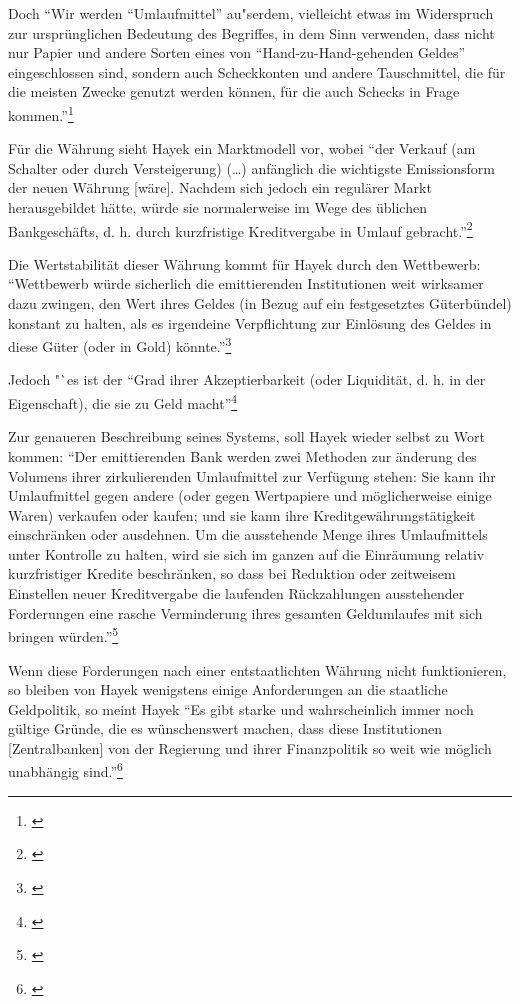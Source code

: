 \documentclass[
        onecolumn,
        a4paper,
        abstracton,
        parskip=half
        ,final
        ]{scrartcl}
\begin{document}
Doch
"`Wir werden "`Umlaufmittel"' au{"s}erdem, vielleicht etwas im Widerspruch zur urspr{\"u}nglichen Bedeutung des Begriffes, in dem Sinn verwenden, dass nicht nur Papier und andere Sorten eines von "`Hand-zu-Hand-gehenden Geldes"' eingeschlossen sind, sondern auch Scheckkonten und andere Tauschmittel, die f{\"u}r die meisten Zwecke genutzt werden k{\"o}nnen, f{\"u}r die auch Schecks in Frage kommen."'\footnote[417]{\citep*[S.43]{Hayek1977}}

F{\"u}r die W{\"a}hrung sieht Hayek ein Marktmodell vor, wobei "`der Verkauf (am Schalter oder durch Versteigerung) (\ldots) anf{\"a}nglich die wichtigste Emissionsform der neuen W{\"a}hrung [w{\"a}re]. Nachdem sich jedoch ein regul{\"a}rer Markt herausgebildet h{\"a}tte, w{\"u}rde sie normalerweise im Wege des {\"u}blichen Bankgesch{\"a}fts, d. h. durch kurzfristige Kreditvergabe in Umlauf gebracht."'\footnote[418]{\citep*[S.31]{Hayek1977}}

Die Wertstabilit{\"a}t dieser W{\"a}hrung kommt f{\"u}r Hayek durch den Wettbewerb: "`Wettbewerb w{\"u}rde sicherlich die emittierenden Institutionen weit wirksamer dazu zwingen, den Wert ihres Geldes (in Bezug auf ein festgesetztes G{\"u}terb{\"u}ndel) konstant zu halten, als es irgendeine Verpflichtung zur Einl{\"o}sung des Geldes in diese G{\"u}ter (oder in Gold) k{\"o}nnte."'\footnote[419]{\citep*[S.32]{Hayek1977}}

Jedoch "`es ist der "`Grad ihrer Akzeptierbarkeit (oder Liquidit{\"a}t, d. h. in der Eigenschaft), die sie zu Geld macht"'\footnote[420]{\citep*[S.40]{Hayek1977}}

Zur genaueren Beschreibung seines Systems, soll Hayek wieder selbst zu Wort kommen: "`Der emittierenden Bank werden zwei Methoden zur {\"a}nderung des Volumens ihrer zirkulierenden Umlaufmittel zur Verf{\"u}gung stehen: Sie kann ihr Umlaufmittel gegen andere (oder gegen Wertpapiere und m{\"o}glicherweise einige Waren) verkaufen oder kaufen; und sie kann ihre Kreditgew{\"a}hrungst{\"a}tigkeit einschr{\"a}nken oder ausdehnen. Um die ausstehende Menge ihres Umlaufmittels unter Kontrolle zu halten, wird sie sich im ganzen auf die Einr{\"a}umung relativ kurzfristiger Kredite beschr{\"a}nken, so dass bei Reduktion oder zeitweisem Einstellen neuer Kreditvergabe die laufenden R{\"u}ckzahlungen ausstehender Forderungen eine rasche Verminderung ihres gesamten Geldumlaufes mit sich bringen w{\"u}rden."'\footnote[421]{\citep*[S.45]{Hayek1977}}

Wenn diese Forderungen nach einer entstaatlichten W{\"a}hrung nicht funktionieren, so bleiben von Hayek wenigstens einige Anforderungen an die staatliche Geldpolitik, so meint Hayek
"`Es gibt starke und wahrscheinlich immer noch g{\"u}ltige Gr{\"u}nde, die es w{\"u}nschenswert machen, dass diese Institutionen [Zentralbanken] von der Regierung und ihrer Finanzpolitik so weit wie m{\"o}glich unabh{\"a}ngig sind."'\footnote[422]{\citep*[S.412]{hayek1971}}
\end{document}
